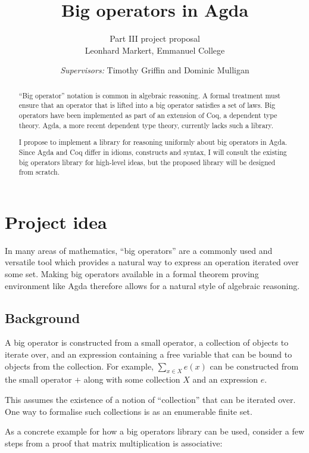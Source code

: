 \documentclass[a4paper]{scrartcl}
\title{Big operators in Agda}
\author{Part III project proposal\\
	Leonhard Markert, Emmanuel College}
\date{\textit{Supervisors:} Timothy Griffin and Dominic Mulligan}
\begin{document}
\maketitle

\begin{abstract}
\enquote{Big operator} notation is common in algebraic reasoning.
A formal treatment must ensure that an operator that is lifted into a big operator satisfies a set of laws.
Big operators have been implemented as part of an extension of Coq, a dependent type theory.
Agda, a more recent dependent type theory, currently lacks such a library.

I propose to implement a library for reasoning uniformly about big operators in Agda.
Since Agda and Coq differ in idioms, constructs and syntax, I will consult the existing big operators library for high-level ideas, but the proposed library will be designed from scratch.
\end{abstract}

\section{Project idea}

In many areas of mathematics, \enquote{big operators} are a commonly used and versatile tool which provides a natural way to express an operation iterated over some set. Making big operators available in a formal theorem proving environment like Agda therefore allows for a natural style of algebraic reasoning.

\subsection{Background}

A big operator is constructed from a small operator, a collection of objects to iterate over, and an expression containing a free variable that can be bound to objects from the collection. For example, \(\sum_{x \in X} e(x)\) can be constructed from the small operator \(+\) along with some collection \(X\) and an expression \(e\).

This assumes the existence of a notion of \enquote{collection} that can be iterated over. One way to formalise such collections is as an enumerable finite set.

As a concrete example for how a big operators library can be used, consider a few steps from a proof that matrix multiplication is associative:
\end{document}
